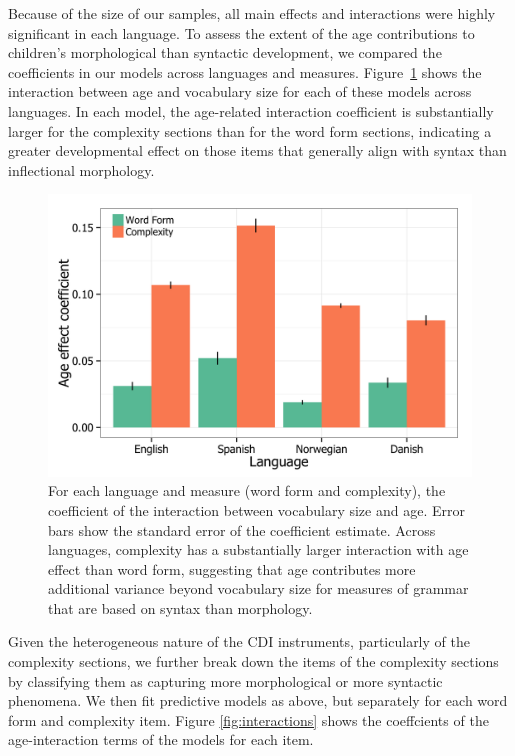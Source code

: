 \documentclass[10pt,letterpaper]{article}
\begin{document}
Because of the size of our samples, all main effects and interactions were highly significant in each language. To assess the extent of the age contributions to children's morphological than syntactic development, we compared the coefficients in our models across languages and measures. Figure~\ref{fig:coefs_grammar} shows the interaction between age and vocabulary size for each of these models across languages. In each model, the age-related interaction coefficient is substantially larger for the complexity sections than for the word form sections, indicating a greater developmental effect on those items that generally align with syntax than inflectional morphology.  

\begin{figure}[t]
\begin{center}
\includegraphics[width=\linewidth]{plots/coefs_wordform_complexity.png}
\end{center}
\caption{\label{fig:coefs_grammar}  For each language and measure (word form and complexity), the coefficient of the interaction between vocabulary size and age. Error bars show the standard error of the coefficient estimate. Across languages, complexity has a substantially larger interaction with age effect than word form, suggesting that age contributes more additional variance beyond vocabulary size for measures of grammar that are based on syntax than morphology.} 
\end{figure}

Given the heterogeneous nature of the CDI instruments, particularly of the complexity sections, we further break down the items of the complexity sections by classifying them as capturing more morphological or more syntactic phenomena. We then fit predictive models as above, but separately for each word form and complexity item. Figure \ref{fig:interactions} shows the coeffcients of the age-interaction terms of the models for each item. 
\end{document}
